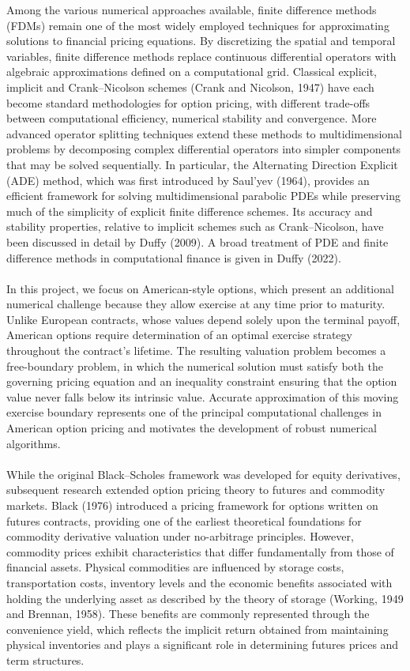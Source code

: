 \documentclass[12pt,a4paper]{article}
\begin{document}
Among the various numerical approaches available, finite difference methods (FDMs) remain one of the most widely employed techniques for approximating solutions to financial pricing equations. By discretizing the spatial and temporal variables, finite difference methods replace continuous differential operators with algebraic approximations defined on a computational grid. Classical explicit, implicit and Crank--Nicolson schemes (Crank and Nicolson, 1947) have each become standard methodologies for option pricing, with different trade-offs between computational efficiency, numerical stability and convergence. More advanced operator splitting techniques extend these methods to multidimensional problems by decomposing complex differential operators into simpler components that may be solved sequentially. In particular, the Alternating Direction Explicit (ADE) method, which was first introduced by Saul'yev (1964), provides an efficient framework for solving multidimensional parabolic PDEs while preserving much of the simplicity of explicit finite difference schemes. Its accuracy and stability properties, relative to implicit schemes such as Crank--Nicolson, have been discussed in detail by Duffy (2009). A broad treatment of PDE and finite difference methods in computational finance is given in Duffy (2022).\\\\
In this project, we focus on American-style options, which present an additional numerical challenge because they allow exercise at any time prior to maturity. Unlike European contracts, whose values depend solely upon the terminal payoff, American options require determination of an optimal exercise strategy throughout the contract's lifetime. The resulting valuation problem becomes a free-boundary problem, in which the numerical solution must satisfy both the governing pricing equation and an inequality constraint ensuring that the option value never falls below its intrinsic value. Accurate approximation of this moving exercise boundary represents one of the principal computational challenges in American option pricing and motivates the development of robust numerical algorithms.\\\\
While the original Black--Scholes framework was developed for equity derivatives, subsequent research extended option pricing theory to futures and commodity markets. Black (1976) introduced a pricing framework for options written on futures contracts, providing one of the earliest theoretical foundations for commodity derivative valuation under no-arbitrage principles. However, commodity prices exhibit characteristics that differ fundamentally from those of financial assets. Physical commodities are influenced by storage costs, transportation costs, inventory levels and the economic benefits associated with holding the underlying asset as described by the theory of storage (Working, 1949 and Brennan, 1958). These benefits are commonly represented through the convenience yield, which reflects the implicit return obtained from maintaining physical inventories and plays a significant role in determining futures prices and term structures.\\\\
\end{document}
